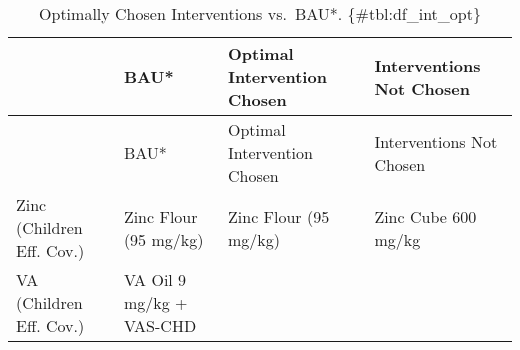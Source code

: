\documentclass[
]{article}
\begin{document}
\begin{longtable}[]{@{}llll@{}}
\caption{Optimally Chosen Interventions vs.~BAU*.
\{\#tbl:df\_int\_opt\}}\tabularnewline
\toprule
\begin{minipage}[b]{0.18\columnwidth}\raggedright
\strut
\end{minipage} & \begin{minipage}[b]{0.22\columnwidth}\raggedright
BAU*\strut
\end{minipage} & \begin{minipage}[b]{0.22\columnwidth}\raggedright
Optimal Intervention Chosen\strut
\end{minipage} & \begin{minipage}[b]{0.28\columnwidth}\raggedright
Interventions Not Chosen\strut
\end{minipage}\tabularnewline
\midrule
\endfirsthead
\toprule
\begin{minipage}[b]{0.18\columnwidth}\raggedright
\strut
\end{minipage} & \begin{minipage}[b]{0.22\columnwidth}\raggedright
BAU*\strut
\end{minipage} & \begin{minipage}[b]{0.22\columnwidth}\raggedright
Optimal Intervention Chosen\strut
\end{minipage} & \begin{minipage}[b]{0.28\columnwidth}\raggedright
Interventions Not Chosen\strut
\end{minipage}\tabularnewline
\midrule
\endhead
\begin{minipage}[t]{0.18\columnwidth}\raggedright
Zinc (Children Eff. Cov.)\strut
\end{minipage} & \begin{minipage}[t]{0.22\columnwidth}\raggedright
Zinc Flour (95 mg/kg)\strut
\end{minipage} & \begin{minipage}[t]{0.22\columnwidth}\raggedright
Zinc Flour (95 mg/kg)\strut
\end{minipage} & \begin{minipage}[t]{0.28\columnwidth}\raggedright
Zinc Cube 600 mg/kg\strut
\end{minipage}\tabularnewline
\begin{minipage}[t]{0.18\columnwidth}\raggedright
VA (Children Eff. Cov.)\strut
\end{minipage} & \begin{minipage}[t]{0.22\columnwidth}\raggedright
VA Oil 9 mg/kg + VAS-CHD\strut

\end{minipage}
\end{longtable}
\end{document}
